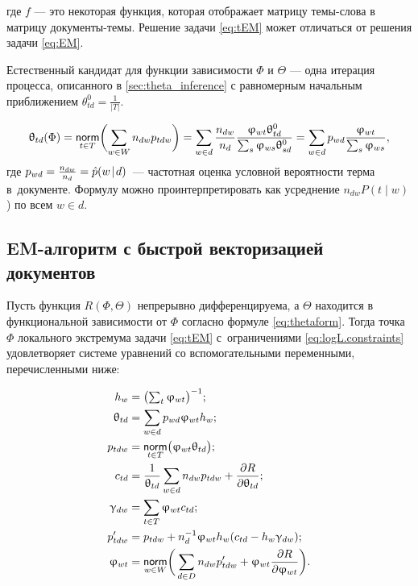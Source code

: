 где $f$ --- это некоторая функция, которая отображает матрицу темы-слова в матрицу документы-темы. Решение задачи \ref{eq:tEM} может отличаться от решения задачи \ref{eq:EM}.

Естественный кандидат для функции зависимости $\Phi$ и $\Theta$ --- одна итерация процесса, описанного в \ref{sec:theta_inference} с равномерным начальным приближением $\theta^0_{td} = \frac1{|T|}$. 

\begin{equation}
\label{eq:thetaform}
    \uptheta_{td}(\Phi)
    = \mathop{\mathsf{norm}}\limits_{t\in T} \biggl( \sum_{w\in W} n_{dw} p_{tdw} \biggr)
    = \sum_{w\in d} \frac{n_{dw}}{n_d} \frac{\upvarphi_{wt} \uptheta^0_{td}}{\sum_s \upvarphi_{ws} \uptheta^0_{sd}}
    = \sum_{w\in d} p_{wd} \frac{\upvarphi_{wt}}{\sum_s \upvarphi_{ws}},
\end{equation}
где $p_{wd} = \frac{n_{dw}}{n_d} = \hat p(w\mspace{2mu}{|}\mspace{2mu} d)$~---
частотная оценка условной вероятности терма в~документе. Формулу можно проинтерпретировать как усреднение $n_{dw} P(t \mid w)$) по всем $w \in d$.

\subsection{EM-алгоритм с быстрой векторизацией документов}
\begin{Theorem}
\label{th:TARTM}
    Пусть функция $R(\Phi,\Theta)$ непрерывно дифференцируема, а $\Theta$ находится в функциональной зависимости от $\Phi$ согласно формуле \ref{eq:thetaform}.
    Тогда точка $\Phi$ локального экстремума задачи
    \eqref{eq:tEM} с~ограничениями \eqref{eq:logL.constraints}
    удовлетворяет системе уравнений со вспомогательными переменными, перечисленными ниже:

\begin{align*}
    h_w         &= \bigl( \textstyle\sum_t \upvarphi_{wt} \bigr)^{-1}; \\
    \uptheta_{td} &= \sum_{w\in d} p_{wd} \upvarphi_{wt} h_w; \\
    p_{tdw}     &= \mathop{\mathsf{norm}}\limits_{t\in T} \bigl(\upvarphi_{wt}\uptheta_{td} \bigr); \\
    c_{td}      &= \frac1{\uptheta_{td}}\sum_{w\in d} n_{dw}p_{tdw} + \frac{\partial R}{\partial \uptheta_{td}}; \\
    \upgamma_{dw} &= \sum_{t\in T} \upvarphi_{wt} c_{td}; \\
    p'_{tdw}    &= p_{tdw} + n_d^{-1} \upvarphi_{wt}h_w (c_{td}-h_w\upgamma_{dw});
\\
    \upvarphi_{wt} &= \mathop{\mathsf{norm}}\limits_{w\in W}
        \biggl(\,
        \sum_{d\in D} n_{dw} p'_{tdw}
        + \upvarphi_{wt} \frac{\partial{R}}{\partial{\ensuremath{\upvarphi}_{wt}}}
        \biggr).
\end{align*}

\end{Theorem}

